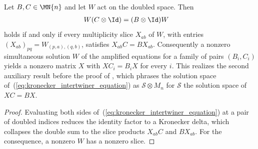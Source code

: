 \begin{lemma}
    \label{lem:pgvwc07_kronecker_intertwiner}
    \leanok
    Let $B,C\in\MN{n}$ and let $W$ act on the doubled space. Then
    \begin{align}
        W(C\otimes\Id) & = (B\otimes\Id)W
        \label{eq:kronecker_intertwiner_equation}
    \end{align}
    holds if and only if every multiplicity slice $X_{ab}$ of $W$, with
    entries $(X_{ab})_{pq}=W_{(p,a),(q,b)}$, satisfies $X_{ab}C=BX_{ab}$.
    Consequently a nonzero simultaneous solution $W$ of the amplified
    equations for a family of pairs $(B_i,C_i)$ yields a nonzero matrix $X$
    with $XC_i=B_iX$ for every $i$. This realizes the second auxiliary result
    before the proof of \cite[Theorem~7]{PerezGarcia2007Matrix}, which
    phrases the solution space of~(\ref{eq:kronecker_intertwiner_equation})
    as $\mathcal{S}\otimes M_n$ for $\mathcal{S}$ the solution space of
    $XC=BX$.
\end{lemma}

\begin{proof}
    \leanok
    Evaluating both sides of~(\ref{eq:kronecker_intertwiner_equation}) at a
    pair of doubled indices reduces the identity factor to a Kronecker delta,
    which collapses the double sum to the slice products $X_{ab}C$ and
    $BX_{ab}$. For the consequence, a nonzero $W$ has a nonzero slice.
\end{proof}

